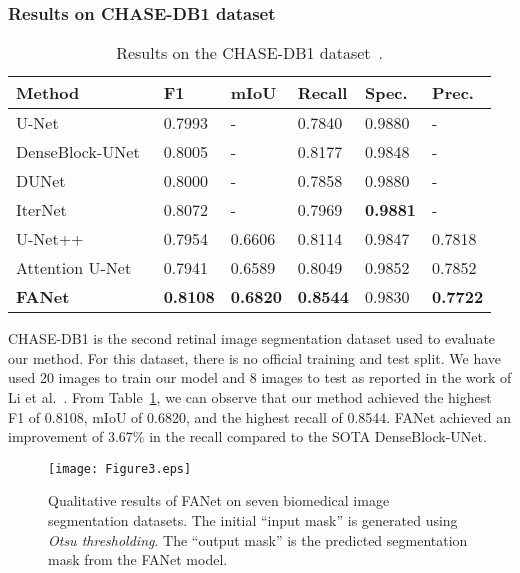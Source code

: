 \documentclass[journal]{IEEEtran}
\begin{document}
\subsubsection{Results on CHASE-DB1 dataset}
\begin{table}[!t]
\footnotesize
\centering
\caption{Results on the CHASE-DB1 dataset~\cite{owen2009measuring}.}
\begin{tabular}{@{}l|l|l|l|l|l@{}}
\toprule
\textbf{Method} & \textbf{F1} & \textbf{mIoU }& \textbf{Recall}& \textbf{Spec.} & \textbf{Prec.} \\ 
\midrule
U-Net~\cite{ronneberger2015u} & 0.7993 & - & 0.7840 & 0.9880 & - \\ DenseBlock-UNet~\cite{yao2020eye3dvas} & 0.8005 & - &0.8177 &0.9848 & - \\ DUNet~\cite{jin2019dunet} & 0.8000 & - &0.7858 &0.9880 & - \\ IterNet~\cite{li2020iternet} & 0.8072 & - &0.7969 & \textbf{0.9881} & -  \\ U-Net++~\cite{zhou2018unet++} &0.7954 &0.6606 &0.8114 &0.9847 &0.7818 \\ Attention U-Net~\cite{oktay2018attention} &0.7941 &0.6589 &0.8049 &0.9852 &0.7852 \\ \textbf{FANet} & \textbf{0.8108} & \textbf{0.6820} & \textbf{0.8544} & 0.9830 & \textbf{0.7722} \\ \bottomrule
\end{tabular}
\label{tab:chaseDB}
\end{table}
CHASE-DB1 is the second retinal image segmentation dataset used to evaluate our method. For this dataset, there is no official training and test split. We have used 20 images to train our model and 8 images to test as reported in the work of Li et al.~\cite{li2020iternet}. From Table~\ref{tab:chaseDB}, we can observe that our method achieved the highest F1 of 0.8108, \ac{mIoU} of 0.6820, and the highest recall of 0.8544. FANet achieved an improvement of 3.67\% in the recall compared to the \ac{SOTA} DenseBlock-UNet. 




\begin{figure}[t!]
    \centering
    \texttt{[image: Figure3.eps]}
    \caption{Qualitative results of FANet on seven biomedical image segmentation datasets. {The initial ``input mask'' is generated using \textit{Otsu thresholding}}. The ``output mask'' is the predicted segmentation mask from the  FANet model.}
    \label{fig:qualitativeresult}
\end{figure}
\end{document}
